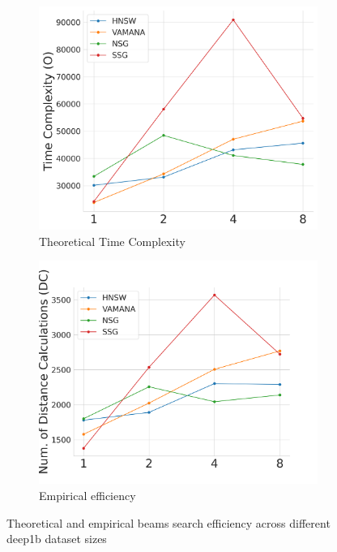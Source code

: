\begin{figure}
\centering
\begin{subfigure}{0.45\textwidth}
  \centering
  \includegraphics[width=\linewidth]{../img/Experiments/BSC/complexity_size.png}
  \caption{Theoretical Time Complexity}
  \label{fig:cno}
\end{subfigure}
\hfill
\begin{subfigure}{0.45\textwidth}
  \centering
  \includegraphics[width=\linewidth]{../img/Experiments/BSC/dc_size.png}
  \caption{Empirical efficiency}
  \label{fig:dc}
\end{subfigure}
\caption{Theoretical and empirical beams search efficiency across different deep1b dataset sizes}
\label{fig:ndc_no_size_plots}
\end{figure}

